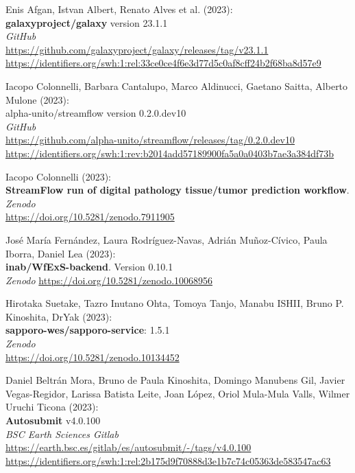 \documentclass[10pt,letterpaper]{article}
\begin{document}
\begin{thebibliography}{10}
\begin{small}
Enis Afgan, Istvan Albert, Renato Alves et al. (2023):\\
\textbf{galaxyproject/galaxy} version 23.1.1\\
\emph{GitHub}\\
\url{https://github.com/galaxyproject/galaxy/releases/tag/v23.1.1}\\
\url{https://identifiers.org/swh:1:rel:33ce0ce4f6e3d77d5c0af8cff24b2f68ba8d57e9}

 Iacopo Colonnelli, Barbara Cantalupo, Marco Aldinucci, Gaetano Saitta, Alberto Mulone (2023):\\
alpha-unito/streamflow version 0.2.0.dev10\\
\emph{GitHub}\\
\url{https://github.com/alpha-unito/streamflow/releases/tag/0.2.0.dev10}\\
\url{https://identifiers.org/swh:1:rev:b2014add57189900fa5a0a0403b7ae3a384df73b}

Iacopo Colonnelli (2023):\\
\textbf{StreamFlow run of digital pathology tissue/tumor prediction workflow}.\\
\emph{Zenodo}\\
\url{https://doi.org/10.5281/zenodo.7911905}

José María Fernández, Laura Rodríguez-Navas, Adrián Muñoz-Cívico, Paula Iborra, Daniel Lea (2023):\\
\textbf{inab/WfExS-backend}. Version 0.10.1\\
\emph{Zenodo}
\url{https://doi.org/10.5281/zenodo.10068956}

Hirotaka Suetake, Tazro Inutano Ohta, Tomoya Tanjo, Manabu ISHII, Bruno P. Kinoshita, DrYak (2023):\\
\textbf{sapporo-wes/sapporo-service}: 1.5.1\\
\emph{Zenodo}\\
\url{https://doi.org/10.5281/zenodo.10134452}

 Daniel Beltrán Mora, Bruno de Paula Kinoshita, Domingo Manubens Gil, Javier Vegas-Regidor, Larissa Batista Leite, Joan López, Oriol Mula-Mula Valls, Wilmer Uruchi Ticona (2023):\\
\textbf{Autosubmit} v4.0.100\\
\emph{BSC Earth Sciences Gitlab}\\
\url{https://earth.bsc.es/gitlab/es/autosubmit/-/tags/v4.0.100}\\
\url{https://identifiers.org/swh:1:rel:2b175d9f70888d3e1b7c74c05363de583547ac63}


\end{small}
\end{thebibliography}
\end{document}
